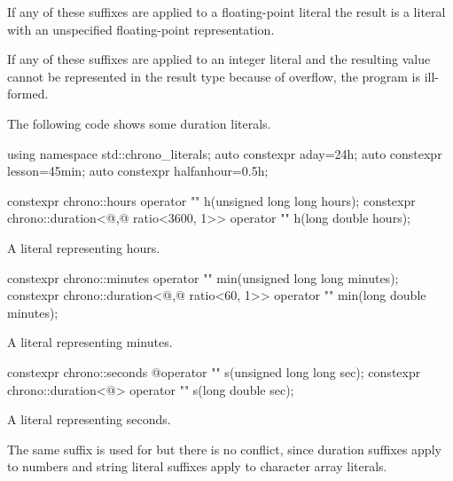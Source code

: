 \pnum
If any of these suffixes are applied to a floating-point literal the result is a
 literal with an unspecified floating-point representation.

\pnum
If any of these suffixes are applied to an integer literal and the resulting
 value cannot be represented in the result type because
of overflow, the program is ill-formed.

\pnum
\begin{example}
The following code shows some duration literals.
\begin{codeblock}
using namespace std::chrono_literals;
auto constexpr aday=24h;
auto constexpr lesson=45min;
auto constexpr halfanhour=0.5h;
\end{codeblock}
\end{example}

%
\begin{itemdecl}
constexpr chrono::hours                                 operator "" h(unsigned long long hours);
constexpr chrono::duration<@\unspec,@ ratio<3600, 1>> operator "" h(long double hours);
\end{itemdecl}

\begin{itemdescr}
\pnum
\returns
A  literal representing  hours.
\end{itemdescr}

%
\begin{itemdecl}
constexpr chrono::minutes                             operator "" min(unsigned long long minutes);
constexpr chrono::duration<@\unspec,@ ratio<60, 1>> operator "" min(long double minutes);
\end{itemdecl}

\begin{itemdescr}
\pnum
\returns
A  literal representing  minutes.
\end{itemdescr}

%
\begin{itemdecl}
constexpr chrono::seconds  @\itcorr@             operator "" s(unsigned long long sec);
constexpr chrono::duration<@\unspec@> operator "" s(long double sec);
\end{itemdecl}

\begin{itemdescr}
\pnum
\returns
A  literal representing  seconds.

\pnum
\begin{note}
The same suffix  is used for  but there is no
conflict, since duration suffixes apply to numbers and string literal suffixes
apply to character array literals.
\end{note}
\end{itemdescr}

